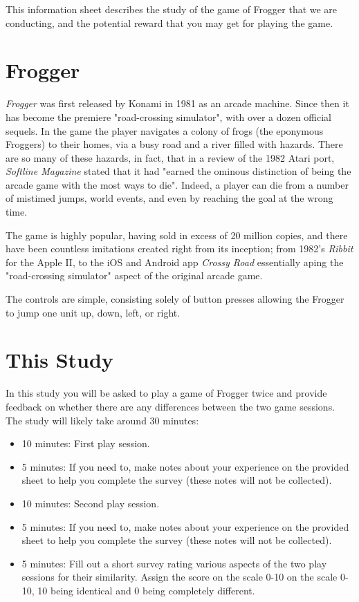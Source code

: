 \documentclass[12pt, a4paper]{report}
\begin{document}
\maketitle

This information sheet describes the study of the game of Frogger that we are conducting, and the potential reward that you may get for playing the game.

\section{Frogger}
\textit{Frogger} was first released by Konami in 1981 as an arcade machine.
Since then it has become the premiere "road-crossing simulator", with over a dozen official sequels.
In the game the player navigates a colony of frogs (the eponymous Froggers) to their homes, via a busy road and a river filled with hazards.
There are so many of these hazards, in fact, that in a review of the 1982 Atari port, \textit{Softline Magazine} stated that it had "earned the ominous distinction of being the arcade game with the most ways to die".
Indeed, a player can die from a number of mistimed jumps, world events, and even by reaching the goal at the wrong time.

\par

The game is highly popular, having sold in excess of 20 million copies, and there have been countless imitations created right from its inception; from 1982's \textit{Ribbit} for the Apple II, to the iOS and Android app \textit{Crossy Road} essentially aping the "road-crossing simulator" aspect of the original arcade game.

\par

The controls are simple, consisting solely of button presses allowing the Frogger to jump one unit up, down, left, or right.

\section{This Study}
In this study you will be asked to play a game of Frogger twice and provide feedback on whether there are any differences between the two game sessions.
The study will likely take around 30 minutes:
\begin{itemize}
  \item 10 minutes: First play session.
  \item 5 minutes: If you need to, make notes about your experience on the provided sheet to help you complete the survey (these notes will not be collected).
  \item 10 minutes: Second play session.
  \item 5 minutes: If you need to, make notes about your experience on the provided sheet to help you complete the survey (these notes will not be collected).
  \item 5 minutes: Fill out a short survey rating various aspects of the two play sessions for their similarity.
        Assign the score on the scale 0-10 on the scale 0-10, 10 being identical and 0 being completely different.
\end{itemize}
\end{document}
